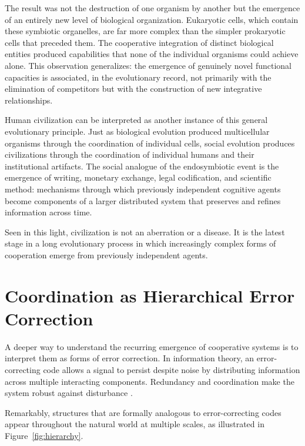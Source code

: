 \documentclass[12pt]{article}
\begin{document}
The result was not the destruction of one organism by another but the emergence of an entirely new level of biological organization. Eukaryotic cells, which contain these symbiotic organelles, are far more complex than the simpler prokaryotic cells that preceded them. The cooperative integration of distinct biological entities produced capabilities that none of the individual organisms could achieve alone. This observation generalizes: the emergence of genuinely novel functional capacities is associated, in the evolutionary record, not primarily with the elimination of competitors but with the construction of new integrative relationships.

Human civilization can be interpreted as another instance of this general evolutionary principle. Just as biological evolution produced multicellular organisms through the coordination of individual cells, social evolution produces civilizations through the coordination of individual humans and their institutional artifacts. The social analogue of the endosymbiotic event is the emergence of writing, monetary exchange, legal codification, and scientific method: mechanisms through which previously independent cognitive agents become components of a larger distributed system that preserves and refines information across time.

Seen in this light, civilization is not an aberration or a disease. It is the latest stage in a long evolutionary process in which increasingly complex forms of cooperation emerge from previously independent agents.

\section{Coordination as Hierarchical Error Correction}
\label{sec:ecc}

A deeper way to understand the recurring emergence of cooperative systems is to interpret them as forms of error correction. In information theory, an error-correcting code allows a signal to persist despite noise by distributing information across multiple interacting components. Redundancy and coordination make the system robust against disturbance \cite{shannon1948}.

Remarkably, structures that are formally analogous to error-correcting codes appear throughout the natural world at multiple scales, as illustrated in Figure~\ref{fig:hierarchy}.
\end{document}
